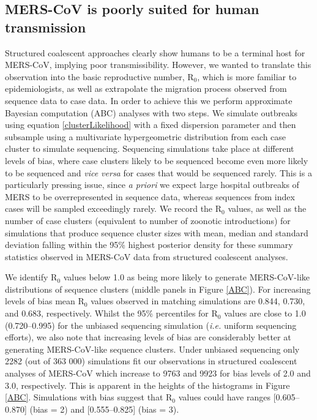\documentclass[11pt,oneside,letterpaper]{article}
\begin{document}
\subsection*{MERS-CoV is poorly suited for human transmission}
Structured coalescent approaches clearly show humans to be a terminal host for MERS-CoV, implying poor transmissibility.
However, we wanted to translate this observation into the basic reproductive number, R$_{0}$, which is more familiar to epidemiologists, as well as extrapolate the migration process observed from sequence data to case data.
In order to achieve this we perform approximate Bayesian computation (ABC) analyses with two steps.
We simulate outbreaks using equation \ref{clusterLikelihood} with a fixed dispersion parameter and then subsample using a multivariate hypergeometric distribution from each case cluster to simulate sequencing.
Sequencing simulations take place at different levels of bias, where case clusters likely to be sequenced become even more likely to be sequenced and \textit{vice versa} for cases that would be sequenced rarely.
This is a particularly pressing issue, since \textit{a priori} we expect large hospital outbreaks of MERS to be overrepresented in sequence data, whereas sequences from index cases will be sampled exceedingly rarely.
We record the R$_{0}$ values, as well as the number of case clusters (equivalent to number of zoonotic introductions) for simulations that produce sequence cluster sizes with mean, median and standard deviation falling within the 95\% highest posterior density for these summary statistics observed in MERS-CoV data from structured coalescent analyses.

We identify R$_{0}$ values below 1.0 as being more likely to generate MERS-CoV-like distributions of sequence clusters (middle panels in Figure \ref{ABC}).
For increasing levels of bias mean R$_{0}$ values observed in matching simulations are 0.844, 0.730, and 0.683, respectively.
Whilst the 95\% percentiles for R$_{0}$ values are close to 1.0 (0.720--0.995) for the unbiased sequencing simulation (\textit{i.e.} uniform sequencing efforts), we also note that increasing levels of bias are considerably better at generating MERS-CoV-like sequence clusters.
Under unbiased sequencing only 2282 (out of 363 000) simulations fit our observations in structured coalescent analyses of MERS-CoV which increase to 9763 and 9923 for bias levels of 2.0 and 3.0, respectively.
This is apparent in the heights of the histograms in Figure \ref{ABC}.
Simulations with bias suggest that R$_{0}$ values could have ranges [0.605--0.870] (bias = 2) and [0.555--0.825] (bias = 3).
\end{document}
